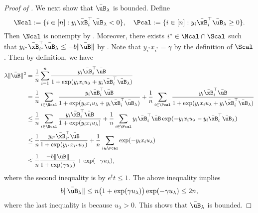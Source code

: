 \documentclass[11pt]{article}
\begin{document}
\begin{proof}[Proof of ]
We next show that $\bar\uB_{\lambda}$ is bounded. 
Define
\[
\Ncal:=\{i\in[n]: y_i\bar\xB_i^\top\bar\uB_{\lambda} < 0\},\quad 
\Pcal:=\{i\in[n]: y_i\bar\xB_i^\top\bar\uB_{\lambda} \ge 0\}.
\]
Then $\Ncal$ is nonempty by . Moreover, there exists $i^*\in \Ncal\cap\Scal$ such that $y_{i^*}\bar\xB_{i^*}^\top\bar\uB_{\lambda}\le -b\|\bar\uB\|$ by .
Note that $y_{i^*}x_{i^*}=\gamma$ by the definition of $\Scal$.
Then by definition, we have 
\begin{align*}
    \lambda\|\bar\uB\|^2 &= \frac{1}{n}\sum_{i=1}^n \frac{y_i\bar \xB_i^\top \bar\uB}{1+\exp(y_i x_i u_{\lambda} + y_i \bar\xB_i^\top \bar\uB_{\lambda} )}\\
    &=\frac{1}{n}\sum_{i\in\Ncal} \frac{y_i\bar \xB_i^\top \bar\uB}{1+\exp(y_i x_i u_{\lambda} + y_i \bar\xB_i^\top \bar\uB_{\lambda} )}+\frac{1}{n}\sum_{i\in\Pcal} \frac{y_i\bar \xB_i^\top \bar\uB}{1+\exp(y_i x_i u_{\lambda} + y_i \bar\xB_i^\top \bar\uB_{\lambda} )} \\
    &\le \frac{1}{n}\sum_{i\in\Ncal} \frac{y_i\bar \xB_i^\top \bar\uB}{1+\exp(y_i x_i u_{\lambda} )} +\frac{1}{n}\sum_{i\in\Pcal} {y_i\bar \xB_i^\top \bar\uB}\exp(-y_i x_i u_{\lambda} - y_i \bar\xB_i^\top \bar\uB_{\lambda} ) \\
    &\le \frac{1}{n} \frac{y_{i^*}\bar \xB_{i^*}^\top \bar\uB}{1+\exp(y_{i^*} x_{i^*} u_{\lambda} )} +\frac{1}{n}\sum_{i\in\Pcal} \exp(-y_i x_i u_{\lambda}  ) \\
    &\le \frac{1}{n} \frac{-b\|\bar\uB\|}{1+\exp(\gamma u_{\lambda} )} + \exp(-\gamma u_{\lambda}  ) ,
\end{align*}
where the second inequality is by $e^{t}t\le 1$. The above inequality implies 
\begin{align*}
    b\|\bar\uB_{\lambda}\| \le n \big(1+\exp(\gamma u_{\lambda} ) \big) \exp(-\gamma u_{\lambda}  ) \le 2n,
\end{align*}
where the last inequality is because $u_{\lambda}>0$. This shows that $\bar\uB_{\lambda}$ is bounded.


\end{proof}
\end{document}
